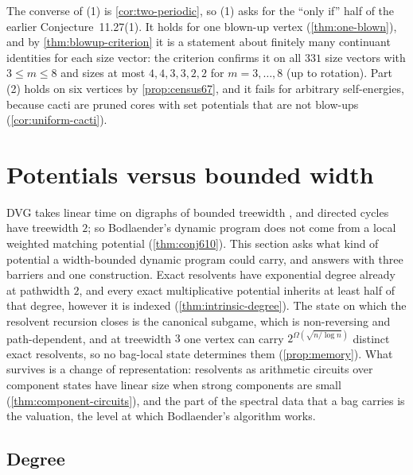 \documentclass[11pt]{amsart}
\theoremstyle{plain}
\theoremstyle{definition}
\theoremstyle{remark}
\numberwithin{equation}{section}
\begin{document}
The converse of (1) is \cref{cor:two-periodic}, so (1) asks for the ``only if'' half of the earlier Conjecture~11.27(1). It holds for one blown-up vertex (\cref{thm:one-blown}), and by \cref{thm:blowup-criterion} it is a statement about finitely many continuant identities for each size vector: the criterion confirms it on all $331$ size vectors with $3\le m\le8$ and sizes at most $4,4,3,3,2,2$ for $m=3,\dots,8$ (up to rotation). Part (2) holds on six vertices by \cref{prop:census67}, and it fails for arbitrary self-energies, because cacti are pruned cores with set potentials that are not blow-ups (\cref{cor:uniform-cacti}).

\section{Potentials versus bounded width}\label{sec:treewidth}

DVG takes linear time on digraphs of bounded treewidth \cite{Bodlaender}, and directed cycles have treewidth $2$; so Bodlaender's dynamic program does not come from a local weighted matching potential (\cref{thm:conj610}). This section asks what kind of potential a width-bounded dynamic program could carry, and answers with three barriers and one construction. Exact resolvents have exponential degree already at pathwidth $2$, and every exact multiplicative potential inherits at least half of that degree, however it is indexed (\cref{thm:intrinsic-degree}). The state on which the resolvent recursion closes is the canonical subgame, which is non-reversing and path-dependent, and at treewidth $3$ one vertex can carry $2^{\Omega(\sqrt{n/\log n})}$ distinct exact resolvents, so no bag-local state determines them (\cref{prop:memory}). What survives is a change of representation: resolvents as arithmetic circuits over component states have linear size when strong components are small (\cref{thm:component-circuits}), and the part of the spectral data that a bag carries is the valuation, the level at which Bodlaender's algorithm works.

\subsection{Degree}
\end{document}
